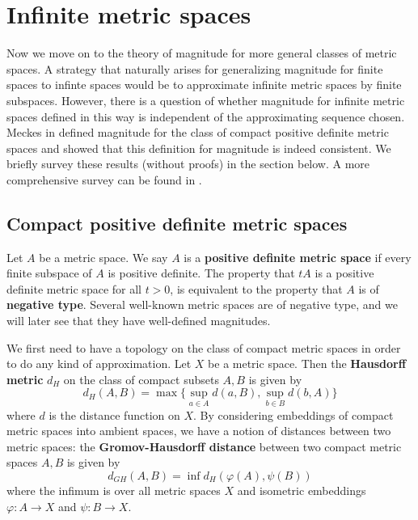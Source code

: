 \documentclass[11pt]{article}
\theoremstyle{mythm}
\begin{document}
\section{Infinite metric spaces}

Now we move on to the theory of magnitude for more general classes of metric spaces. A strategy that naturally arises for generalizing magnitude for finite spaces to infinte spaces would be to approximate infinite metric spaces by finite subspaces. However, there is a question of whether magnitude for infinite metric spaces defined in this way is independent of the approximating sequence chosen. Meckes in \cite{meckes_positive_2013} defined magnitude for the class of compact positive definite metric spaces and showed that this definition for magnitude is indeed consistent. We briefly survey these results (without proofs) in the section below. A more comprehensive survey can be found in \cite{leinster_magnitude_2017}.

\subsection{Compact positive definite metric spaces}

Let $A$ be a metric space. We say $A$ is a \textbf{positive definite metric space} if every finite subspace of $A$ is positive definite. The property that $tA$ is a positive definite metric space for all $t > 0$, is equivalent to the property that $A$ is of \textbf{negative type}. Several well-known metric spaces are of negative type, and we will later see that they have well-defined magnitudes.

We first need to have a topology on the class of compact metric spaces in order to do any kind of approximation. Let $X$ be a metric space. Then the \textbf{Hausdorff metric} $d_H$ on the class of compact subsets $A,B$ is given by
\begin{equation*}
d_H(A,B) = \max\{\sup\limits_{a\in A}d(a,B),\sup\limits_{b\in B}d(b,A)\}
\end{equation*}
where $d$ is the distance function on $X$. By considering embeddings of compact metric spaces into ambient spaces, we have a notion of distances between two metric spaces: the \textbf{Gromov-Hausdorff distance} between two compact metric spaces $A,B$ is given by
\begin{equation*}
d_{GH}(A,B) = \inf d_H(\varphi(A),\psi(B))
\end{equation*}
where the infimum is over all metric spaces $X$ and isometric embeddings $\varphi:A \to X$ and $\psi: B \to X$.
\end{document}
